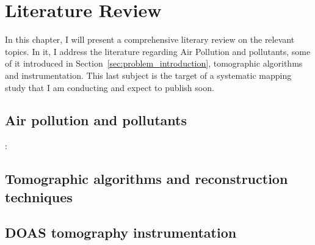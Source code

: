 \chapter{Literature Review}
\label{cha:literature_review}

In this chapter, I will present a comprehensive literary review on the
relevant topics. In it, I address the literature regarding Air
Pollution and pollutants, some of it introduced in
Section~\ref{sec:problem_introduction}, tomographic algorithms and
instrumentation. This last subject is the target of a systematic mapping
study that I am conducting and expect to publish soon.

\section{Air pollution and pollutants}%
\label{sec:air_pollution_and_pollutants}
:


\section{Tomographic algorithms and reconstruction techniques}%
\label{sec:tomographic_algorithms_and_reconstruction_techniques}

\section{DOAS tomography instrumentation}%
\label{sec:doas_tomography_instrumentation}











